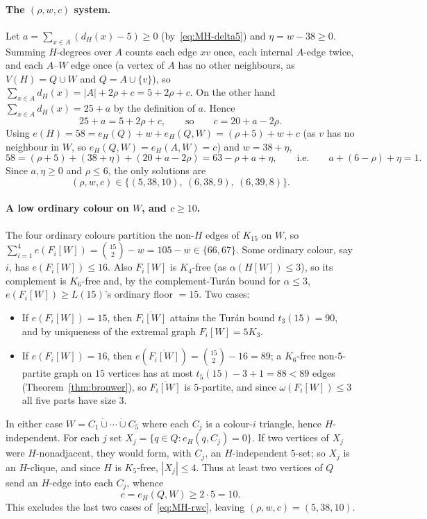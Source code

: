 \documentclass[11pt,reqno]{amsart}
\theoremstyle{definition}
\theoremstyle{remark}
\newcommand{\abs}[1]{\left|#1\right|}
\begin{document}
\paragraph{The $(\rho,w,c)$ system.}
Let $a=\sum_{x\in A}(d_H(x)-5)\ge 0$ (by~\eqref{eq:MH-delta5}) and $\eta=w-38\ge 0$.
Summing $H$-degrees over $A$ counts each edge $xv$ once, each internal $A$-edge
twice, and each $A$--$W$ edge once (a vertex of $A$ has no other neighbours, as
$V(H)=Q\cup W$ and $Q=A\cup\{v\}$), so
$\sum_{x\in A}d_H(x)=\abs A+2\rho+c=5+2\rho+c$. On the other hand
$\sum_{x\in A}d_H(x)=25+a$ by the definition of $a$. Hence
\[
  25+a=5+2\rho+c,\qquad\text{so}\qquad c=20+a-2\rho .
\]
Using $e(H)=58=e_H(Q)+w+e_H(Q,W)=(\rho+5)+w+c$ (as $v$ has no neighbour in $W$, so
$e_H(Q,W)=e_H(A,W)=c$) and $w=38+\eta$,
\[
  58=(\rho+5)+(38+\eta)+(20+a-2\rho)=63-\rho+a+\eta,\qquad\text{i.e.}\qquad
  a+(6-\rho)+\eta=1 .
\]
Since $a,\eta\ge 0$ and $\rho\le 6$, the only solutions are
\begin{equation}\label{eq:MH-rwc}
  (\rho,w,c)\in\{(5,38,10),\ (6,38,9),\ (6,39,8)\}.
\end{equation}

\paragraph{A low ordinary colour on $W$, and $c\ge 10$.}
The four ordinary colours partition the non-$H$ edges of $K_{15}$ on $W$, so
$\sum_{i=1}^4 e(F_i[W])=\binom{15}{2}-w=105-w\in\{66,67\}$. Some ordinary colour,
say $i$, has $e(F_i[W])\le 16$. Also $F_i[W]$ is $K_4$-free (as $\alpha(H[W])\le 3$),
so its complement is $K_6$-free and, by the complement-Tur\'an bound for $\alpha\le
3$, $e(F_i[W])\ge L(15)$'s ordinary floor $=15$. Two cases:
\begin{itemize}[nosep]
\item If $e(F_i[W])=15$, then $\overline{F_i[W]}$ attains the Tur\'an bound
$t_3(15)=90$, and by uniqueness of the extremal graph $F_i[W]=5K_3$.
\item If $e(F_i[W])=16$, then $e(\overline{F_i[W]})=\binom{15}2-16=89$; a $K_6$-free
non-$5$-partite graph on $15$ vertices has at most $t_5(15)-3+1=88<89$ edges
(Theorem~\ref{thm:brouwer}), so $\overline{F_i[W]}$ is $5$-partite, and since
$\omega(F_i[W])\le 3$ all five parts have size $3$.
\end{itemize}
In either case $W=C_1\dot\cup\cdots\dot\cup C_5$ where each $C_j$ is a colour-$i$
triangle, hence $H$-independent. For each $j$ set $X_j=\{q\in Q:e_H(q,C_j)=0\}$. If
two vertices of $X_j$ were $H$-nonadjacent, they would form, with $C_j$, an
$H$-independent $5$-set; so $X_j$ is an $H$-clique, and since $H$ is $K_5$-free,
$\abs{X_j}\le 4$. Thus at least two vertices of $Q$ send an $H$-edge into each
$C_j$, whence
\begin{equation}\label{eq:MH-c10}
  c=e_H(Q,W)\ge 2\cdot 5=10 .
\end{equation}
This excludes the last two cases of~\eqref{eq:MH-rwc}, leaving $(\rho,w,c)=(5,38,10)$.
\end{document}
